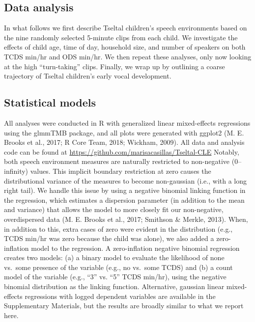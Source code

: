 \documentclass[floatsintext,man]{apa6}
\theoremstyle{definition}
\theoremstyle{definition}
\theoremstyle{definition}
\theoremstyle{remark}
\begin{document}
\subsection{Data analysis}\label{methods-analysisinfo}

In what follows we first describe Tseltal children's speech environments
based on the nine randomly selected 5-minute clips from each child. We
investigate the effects of child age, time of day, household size, and
number of speakers on both TCDS min/hr and ODS min/hr. We then repeat
these analyses, only now looking at the high \enquote{turn-taking}
clips. Finally, we wrap up by outlining a coarse trajectory of Tseltal
children's early vocal development.

\subsection{Statistical models}\label{statistical-models}

All analyses were conducted in R with generalized linear mixed-effects
regressions using the glmmTMB package, and all plots were generated with
ggplot2 (M. E. Brooks et al., 2017; R Core Team, 2018; Wickham, 2009).
All data and analysis code can be found at
\url{https://github.com/marisacasillas/Tseltal-CLE} Notably, both speech
environment measures are naturally restricted to non-negative
(0--infinity) values. This implicit boundary restriction at zero causes
the distributional variance of the measures to become non-gaussian
(i.e., with a long right tail). We handle this issue by using a negative
binomial linking function in the regression, which estimates a
dispersion parameter (in addition to the mean and variance) that allows
the model to more closely fit our non-negative, overdispersed data (M.
E. Brooks et al., 2017; Smithson \& Merkle, 2013). When, in addition to
this, extra cases of zero were evident in the distribution (e.g., TCDS
min/hr was zero because the child was alone), we also added a
zero-inflation model to the regression. A zero-inflation negative
binomial regression creates two models: (a) a binary model to evaluate
the likelihood of none vs.~some presence of the variable (e.g., no
vs.~some TCDS) and (b) a count model of the variable (e.g., \enquote{3}
vs. \enquote{5} TCDS min/hr), using the negative binomial distribution
as the linking function. Alternative, gaussian linear mixed-effects
regressions with logged dependent variables are available in the
Supplementary Materials, but the results are broadly similar to what we
report here.
\end{document}
